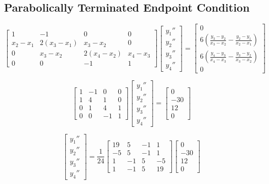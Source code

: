 \documentclass[11pt]{article} %
\begin{document}


\subsection*{Parabolically Terminated Endpoint Condition}

$$\begin{bmatrix} 1 & -1 & 0 & 0 \\ x_2 - x_1 & 2(x_3 - x_1) & x_3 - x_2 & 0 
		 \\ 0 & x_3 - x_2 & 2(x_4 - x_2) & x_4 - x_3 \\ 0 & 0 & -1 & 1
\end{bmatrix}
\begin{bmatrix} y_1'' \\ y_2'' \\ y_3'' \\ y_4'' \end{bmatrix} = 
\begin{bmatrix} 0 \\ 6\left( \frac{y_3 - y_2}{x_3 - x_2} - \frac{y_2-y_1}{x_2 - x_1} \right) \\ 
			 6\left( \frac{y_4 - y_3}{x_4 - x_3} - \frac{y_3-y_2}{x_3 - x_2} \right) \\ 0\end{bmatrix}$$


$$\begin{bmatrix} 1 & -1 & 0 & 0 \\ 1 & 4 &1 & 0 
		 \\ 0 & 1 & 4 & 1 \\ 0 & 0 & -1 & 1
\end{bmatrix}
\begin{bmatrix} y_1'' \\ y_2'' \\ y_3'' \\ y_4'' \end{bmatrix} = 
\begin{bmatrix} 0 \\ -30 \\ 12 \\ 0\end{bmatrix}$$

$$
\begin{bmatrix} y_1'' \\ y_2'' \\ y_3'' \\ y_4'' \end{bmatrix} = 
\frac{1}{24}\begin{bmatrix}19 & 5 & -1 & 1 \\ -5 & 5 & -1 & 1 
		 \\  1 & -1 & 5 & -5 \\ 1 & -1 & 5 & 19
\end{bmatrix}
\begin{bmatrix} 0 \\ -30 \\ 12 \\ 0\end{bmatrix}$$
\end{document}
